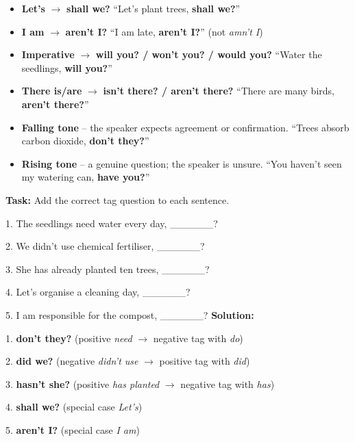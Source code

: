 \documentclass[11pt]{article}
\begin{document}
\begin{exemplebox}
\begin{itemize}
\item \textbf{Let's} $\rightarrow$ \textbf{shall we?} \quad ``Let's plant trees, \textbf{shall we?}''
\item \textbf{I am} $\rightarrow$ \textbf{aren't I?} \quad ``I am late, \textbf{aren't I?}'' (not \emph{amn't I})
\item \textbf{Imperative} $\rightarrow$ \textbf{will you? / won't you? / would you?} \quad ``Water the seedlings, \textbf{will you?}''
\item \textbf{There is/are} $\rightarrow$ \textbf{isn't there? / aren't there?} \quad ``There are many birds, \textbf{aren't there?}''
\end{itemize}
\end{exemplebox}

\begin{exemplebox}[Intonation]
\begin{itemize}
\item \textbf{Falling tone} -- the speaker expects agreement or confirmation. \quad ``Trees absorb carbon dioxide, \textbf{don't they?}''
\item \textbf{Rising tone} -- a genuine question; the speaker is unsure. \quad ``You haven't seen my watering can, \textbf{have you?}''
\end{itemize}
\end{exemplebox}

\begin{exoresolu}
\textbf{Task:} Add the correct tag question to each sentence.

1. The seedlings need water every day, \_\_\_\_\_\_?

2. We didn't use chemical fertiliser, \_\_\_\_\_\_?

3. She has already planted ten trees, \_\_\_\_\_\_?

4. Let's organise a cleaning day, \_\_\_\_\_\_?

5. I am responsible for the compost, \_\_\_\_\_\_?
\tcblower
\textbf{Solution:}

1. \textbf{don't they?} (positive \emph{need} $\rightarrow$ negative tag with \emph{do})

2. \textbf{did we?} (negative \emph{didn't use} $\rightarrow$ positive tag with \emph{did})

3. \textbf{hasn't she?} (positive \emph{has planted} $\rightarrow$ negative tag with \emph{has})

4. \textbf{shall we?} (special case \emph{Let's})

5. \textbf{aren't I?} (special case \emph{I am})
\end{exoresolu}
\end{document}
